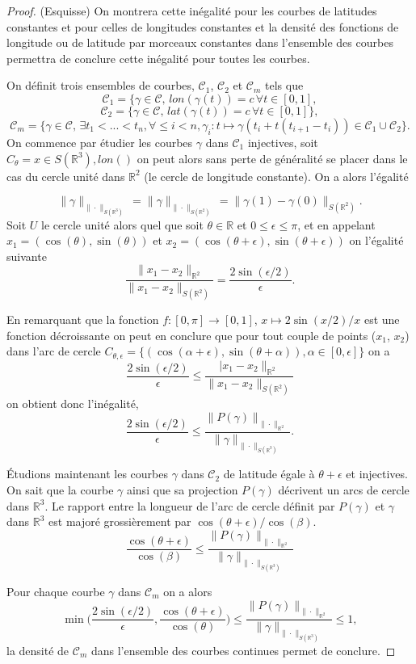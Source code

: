 \documentclass[a4paper,10pt]{article}
\begin{document}
\begin{proof} (Esquisse) On montrera cette inégalité pour les courbes de latitudes constantes et pour celles de longitudes constantes et la densité des fonctions de longitude ou de latitude par morceaux constantes dans l'ensemble des courbes permettra de conclure cette inégalité pour toutes les courbes.

\vspace{4mm}

On définit trois ensembles de courbes, $\mathcal{C}_1$, $\mathcal{C}_2$ et $\mathcal{C}_{m}$ tels que \[\mathcal{C}_1=\{\gamma \in \mathcal{C},\, lon(\gamma(t))=c \, \forall t \in [0,1],\]
\[\mathcal{C}_2=\{\gamma \in \mathcal{C},\, lat(\gamma(t))=c \,\forall t \in [0,1]\},\]
\[\mathcal{C}_m=\{\gamma \in \mathcal{C},\, \exists t_1<...<t_n,\forall \leq i<n, \gamma_i: t \mapsto \gamma(t_i+ t(t_{i+1}-t_i)) \in \mathcal{C}_1 \cup \mathcal{C}_2\}.\]
On commence par étudier les courbes $\gamma$ dans $\mathcal{C}_1$ injectives, soit $C_{\theta}={x \in S(\mathbb{R}^3), lon()}$  on peut alors sans perte de généralité se placer dans le cas du cercle unité dans $\mathbb{R}^2$ (le cercle de longitude constante). On a alors l'égalité

\[\|\gamma\|_{\|\cdot\|_{S(\mathbb{R}^3)}}=\|\gamma\|_{\|\cdot\|_{S(\mathbb{R}^2)}}=\|\gamma(1)-\gamma(0)\|_{S(\mathbb{R}^2)}.\]
Soit $U$ le cercle unité alors quel que soit $\theta \in \mathbb{R}$ et $0 \leq \epsilon \leq \pi$, et en appelant  $x_1=(\cos(\theta), \sin(\theta))$ et $x_2=(\cos(\theta+\epsilon), \sin(\theta+\epsilon))$ on l'égalité suivante
	\[\frac{\|x_1-x_2\|_{\mathbb{R}^2}}{\|x_1-x_2\|_{S(\mathbb{R}^2)}}= \frac{2\sin(\epsilon/2)}{\epsilon}.\]


En remarquant que la fonction $f:[0,\pi]\to [0,1]$, $x\mapsto 2\sin(x/2)/x$ est une fonction décroissante on peut en conclure que pour tout couple de points ($x_1$, $x_2$) dans l'arc de cercle $C_{\theta,\epsilon}=\{(\cos(\alpha+\epsilon), \sin(\theta+\alpha)), \alpha \in [0,\epsilon]\} $ on a 
\[\frac{2\sin(\epsilon/2)}{\epsilon}\leq\frac{|x_1-x_2\|_{\mathbb{R}^2}}{\|x_1-x_2\|_{S(\mathbb{R}^2)}}\]
on obtient donc l'inégalité,
\[\frac{2\sin(\epsilon/2)}{\epsilon}\leq\frac{\|P(\gamma)\|_{\|\cdot\|_{\mathbb{R}^2}}}{\|\gamma\|_{\|\cdot\|_{S(\mathbb{R}^3)}}}.\]

Étudions maintenant les courbes $\gamma$ dans $\mathcal{C}_2$ de latitude égale à $\theta+\epsilon$ et injectives. On sait que la courbe $\gamma$ ainsi que sa projection $P(\gamma)$ décrivent un arcs de cercle dans $\mathbb{R}^3$. Le rapport entre la longueur de l'arc de cercle définit par $P(\gamma)$ et $\gamma$ dans $\mathbb{R}^3$ est majoré grossièrement par $\cos(\theta+\epsilon)/\cos(\beta)$.
\[\frac{\cos(\theta+\epsilon)}{\cos(\beta)}\leq\frac{\|P(\gamma)\|_{\|\cdot\|_{\mathbb{R}^2}}}{\|\gamma\|_{\|\cdot\|_{S(\mathbb{R}^3)}}}\]

Pour chaque courbe $\gamma$ dans $\mathcal{C}_m$ on a alors 
\[\min\Big(\frac{2\sin(\epsilon/2)}{\epsilon},\frac{\cos(\theta+\epsilon)}{\cos(\theta)} \Big)\leq \frac{\|P(\gamma)\|_{\|\cdot\|_{\mathbb{R}^2}}}{\|\gamma\|_{\|\cdot\|_{S(\mathbb{R}^3)}}} \leq 1,\]
la densité de $\mathcal{C}_m$ dans l'ensemble des courbes continues permet de conclure.
\end{proof}
\end{document}
